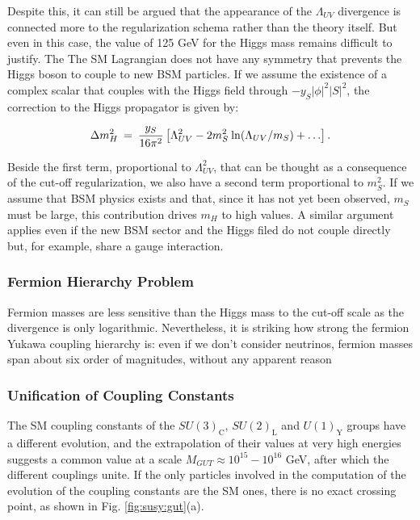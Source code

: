 Despite this, it can still be argued that the appearance of the $\Lambda_{UV}$ divergence is connected more to the regularization schema rather than the theory itself. But even in this case, the value of 125 GeV for the Higgs mass remains difficult to justify. The The SM Lagrangian does not have any symmetry that prevents the Higgs boson to couple to new BSM particles. If we assume the existence of a complex scalar that couples with the Higgs field through $ -y_S|\phi|^2 |S|^2$, the correction to the Higgs propagator is given by:

\begin{equation}
\Delta m_H^2 \>=\> {y_S\over 16 \pi^2}
\left [\Lambda_{UV}^2 - 2 m_S^2
\> {\rm ln}(\Lambda_{UV}/m_S) + \ldots
\right ].
\label{eq:divhs}
\end{equation}

Beside the first term, proportional to $\Lambda_{UV}^2$, that can be thought as a consequence of the cut-off regularization, we also have a second  term proportional to $m_S^2$. If we assume that BSM physics exists and that, since it has not yet been observed, $m_S$ must be large, this contribution drives $m_H$ to high values. A similar argument applies even if the new BSM sector and the Higgs filed do not couple directly but, for example, share a gauge interaction.

\subsubsection*{Fermion Hierarchy Problem} 

Fermion masses are less sensitive than the Higgs mass to the cut-off scale as the divergence is only logarithmic. Nevertheless, it is striking how strong the fermion Yukawa coupling hierarchy is: even if we don't consider neutrinos, fermion masses span about six order of magnitudes, without any apparent reason

\subsubsection*{Unification of Coupling Constants}

The SM coupling constants of the $SU(3)_\mathrm{C}$, $SU(2)_\mathrm{L}$ and $U(1)_\mathrm{Y}$ groups have a different evolution, and the extrapolation of their values at very high energies suggests a common value at a scale $M_{GUT} \approx 10^{15}-10^{16}$ GeV, after which the different couplings unite. If the only particles involved in the computation of the evolution of the coupling constants are the SM ones, there is no exact crossing point, as shown in Fig. \ref{fig:susy:gut}(a).

